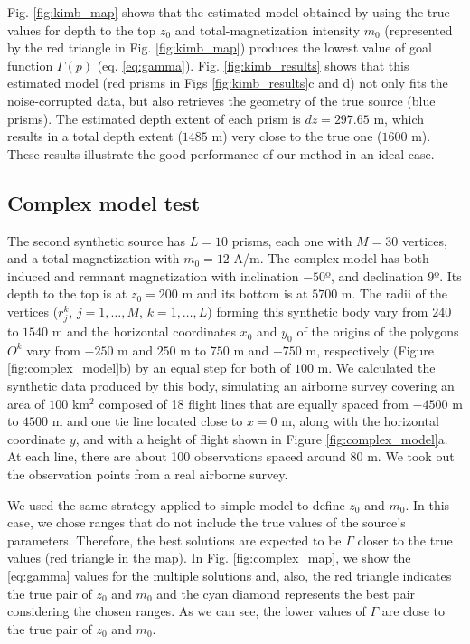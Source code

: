 Fig. \ref{fig:kimb_map} shows that the estimated model obtained by using the true values for depth to the top $ z_0 $ and total-magnetization intensity $ m_0 $ (represented by the red triangle in Fig. \ref{fig:kimb_map}) produces the lowest value of goal function  $ \Gamma(p) $ (eq. \ref{eq:gamma}). Fig. \ref{fig:kimb_results} shows that this estimated model (red prisms in Figs \ref{fig:kimb_results}c and d) not only fits the noise-corrupted data, but also retrieves the geometry of the true source (blue prisms). The estimated depth extent of each prism is $ dz = 297.65 $ m, which results in a total depth extent ($ 1485$ m) very close to the true one ($ 1600 $ m). These results illustrate the good performance of our method in an ideal case.

\subsection{Complex model test}

The second synthetic source has $L=10$ prisms, each one with $M=30$ vertices, and a total magnetization with $m_0 =12$ A/m. The complex model has both induced and remnant magnetization with inclination $-50$º, and declination $9$º. Its depth to the top is at $z_0=200$ m and its bottom is at $5700$ m. The radii of the vertices ($r_j^k$, $j=1,\dots,M$, $k=1,\dots,L$) forming this synthetic body vary from $240$ to $1540$ m and the horizontal coordinates $x_0$ and $y_0$ of the origins of the polygons $O^k$ vary from $-250$ m and $250$ m to $750$ m and $-750$ m, respectively (Figure \ref{fig:complex_model}b) by an equal step for both of $100$ m. We calculated the synthetic data produced by this body, simulating an airborne survey covering an area of $100$ km$^2$ composed of 18 flight lines that are equally spaced from $-4500$ m to $4500$ m and one tie line located close to $x=0$ m, along with the horizontal coordinate $y$, and with a height of flight shown in Figure \ref{fig:complex_model}a. At each line, there are about 100 observations spaced around $80$ m. We took out the observation points from a real airborne survey.

We used the same strategy applied to simple model to define $z_0$ and $ m_0 $. In this case, we chose ranges that do not include the true values of the source's parameters. Therefore, the best solutions are expected to be $\Gamma$ closer to the true values (red triangle in the map). In Fig. \ref{fig:complex_map}, we show the \ref{eq:gamma} values for the multiple solutions and, also, the red triangle indicates the true pair of $z_0$ and $ m_0 $ and the cyan diamond represents the best pair considering the chosen ranges. As we can see, the lower values of $\Gamma$ are close to the true pair of $z_0$ and $ m_0 $.

